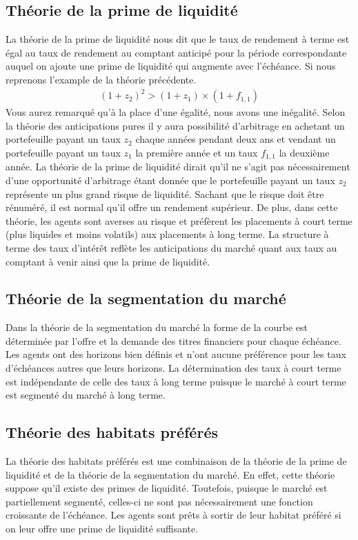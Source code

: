 \documentclass[letterpaper, 12pt]{article}
\newcommand{\1}{\mathds{1}}	%
\theoremstyle{definition}
\begin{document}
\subsection{Théorie de la prime de liquidité}
La théorie de la prime de liquidité nous dit que le taux de rendement à terme est égal au taux de rendement au comptant anticipé pour la période correspondante auquel on ajoute une prime de liquidité qui augmente avec l’échéance.  Si nous reprenons l'example de la théorie précédente.
\begin{align*}
(1+z_2)^2>(1+z_1) \times (1+f_{1,1})
\end{align*}
Vous aurez remarqué qu'à la place d'une égalité, nous avons une inégalité.  Selon la théorie des anticipations pures  il y aura possibilité d'arbitrage en achetant un portefeuille payant un taux $z_2$ chaque années pendant deux ans et vendant un portefeuille payant un taux $z_1$ la première année et un taux $f_{1,1}$ la deuxième année.  La théorie de la prime de liquidité dirait qu'il ne s'agit pas nécessairement d'une opportunité d'arbitrage étant donnée que le portefeuille payant un taux $z_2$ représente un plus grand risque de liquidité.  Sachant que le risque doit être rénuméré,  il est normal qu'il offre un rendement supérieur.  De plus,  dans cette théorie,  les agents sont averses au risque et préfèrent les placements à court terme (plus liquides et moins volatils) aux placements à long terme.  La structure à terme des taux d’intérêt reflète les anticipations du marché quant aux taux au comptant à venir ainsi que la prime de liquidité.

\subsection{Théorie de la segmentation du marché}
Dans la théorie de la segmentation du marché la forme de la courbe est déterminée par l’offre et la demande des titres financiers pour chaque échéance.  Les agents ont des horizons bien définis et n’ont aucune préférence pour les taux d’échéances autres que leurs horizons.  La détermination des taux à court terme est indépendante de celle des taux à long terme puisque le marché à court terme est segmenté du marché à long terme.
\subsection{Théorie des habitats préférés}
La théorie des habitats préférés est une combinaison de la théorie de la prime de liquidité et de la théorie de la segmentation du marché.  En effet,  cette théorie suppose qu'il existe des primes de liquidité.  Toutefois,  puisque le marché est partiellement segmenté,  celles-ci ne sont pas nécessairement une fonction croissante de l’échéance.  Les agents sont prêts à sortir de leur habitat préféré si on leur offre une prime de liquidité suffisante.
\end{document}
